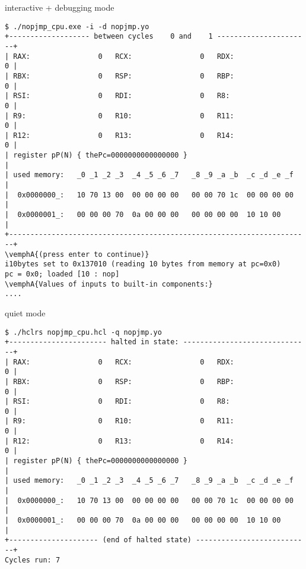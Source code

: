 \begin{frame}[fragile,label=interDebugNopJmp]{interactive + debugging mode}
\begin{Verbatim}[fontsize=\fontsize{8}{9}\selectfont,commandchars=\\\{\}]
$ ./nopjmp_cpu.exe -i -d nopjmp.yo
+------------------- between cycles    0 and    1 ----------------------+
| RAX:                0   RCX:                0   RDX:                0 |
| RBX:                0   RSP:                0   RBP:                0 |
| RSI:                0   RDI:                0   R8:                 0 |
| R9:                 0   R10:                0   R11:                0 |
| R12:                0   R13:                0   R14:                0 |
| register pP(N) { thePc=0000000000000000 }                             |
| used memory:   _0 _1 _2 _3  _4 _5 _6 _7   _8 _9 _a _b  _c _d _e _f    |
|  0x0000000_:   10 70 13 00  00 00 00 00   00 00 70 1c  00 00 00 00    |
|  0x0000001_:   00 00 00 70  0a 00 00 00   00 00 00 00  10 10 00       |
+-----------------------------------------------------------------------+
\vemphA{(press enter to continue)}
i10bytes set to 0x137010 (reading 10 bytes from memory at pc=0x0)
pc = 0x0; loaded [10 : nop]
\vemphA{Values of inputs to built-in components:}
....
\end{Verbatim}
\end{frame}


\begin{frame}[fragile,label=quietNopJmp]{quiet mode}
\begin{Verbatim}[fontsize=\fontsize{8}{9}\selectfont]
$ ./hclrs nopjmp_cpu.hcl -q nopjmp.yo
+----------------------- halted in state: ------------------------------+
| RAX:                0   RCX:                0   RDX:                0 |
| RBX:                0   RSP:                0   RBP:                0 |
| RSI:                0   RDI:                0   R8:                 0 |
| R9:                 0   R10:                0   R11:                0 |
| R12:                0   R13:                0   R14:                0 |
| register pP(N) { thePc=0000000000000000 }                             |
| used memory:   _0 _1 _2 _3  _4 _5 _6 _7   _8 _9 _a _b  _c _d _e _f    |
|  0x0000000_:   10 70 13 00  00 00 00 00   00 00 70 1c  00 00 00 00    |
|  0x0000001_:   00 00 00 70  0a 00 00 00   00 00 00 00  10 10 00       |
+--------------------- (end of halted state) ---------------------------+
Cycles run: 7
\end{Verbatim}
\end{frame}

